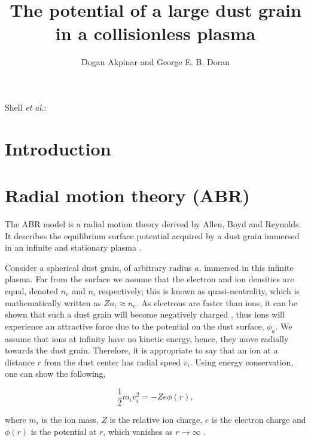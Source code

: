 \documentclass{article}
\begin{document}
\title{The potential of a large dust grain in a collisionless plasma}
\author{Dogan Akpinar and George E. B. Doran}
{Shell \MakeLowercase{\textit{et al.}}:}

\maketitle

\begin{abstract}

\end{abstract}

\section{Introduction}

\section{Radial motion theory (ABR)}

\smallskip

The ABR model is a radial motion theory derived by Allen, Boyd and Reynolds. It describes the equilibrium surface potential acquired
by a dust grain immersed in an infinite and stationary plasma \cite{ABR}.

\medskip

Consider a spherical dust grain, of arbitrary radius $a$, immersed in this infinite plasma. Far from the surface we assume that the electron
and ion densities are equal, denoted $n_e$ and $n_i$ respectively; this is known as quasi-neutrality, which is mathematically written as
$Zn_i \approx n_e$. As electrons are faster than ions, it can be shown that such a dust grain will become negatively 
charged \cite{Thomas}, thus ions will experience an attractive force due to the potential on the dust surface, 
$\phi_a$. We assume that ions at infinity have no kinetic energy, hence, they move radially
towards the dust grain. Therefore, it is appropriate to say that an ion at a distance 
$r$ from the dust center has radial speed $v_i$. Using energy conservation, one can show the following,

\begin{equation}\label{eq:EnergyConservation}
\frac{1}{2} m_i v_i^2 = -Ze\phi(r),
\end{equation}

\noindent where $m_i$ is the ion mass, $Z$ is the relative ion charge, $e$ is the electron charge and
$\phi(r)$ is the potential at $r$, which vanishes as $r \to \infty$ \cite{ABR}.
\end{document}
